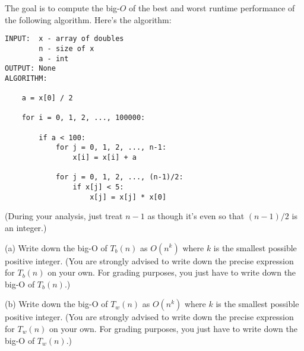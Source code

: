 The goal is to compute the big-$O$ of the best and worst
runtime performance
of the following algorithm. 
Here's the algorithm:
\begin{Verbatim}[frame=single]
INPUT:  x - array of doubles
        n - size of x
        a - int
OUTPUT: None
ALGORITHM:

    a = x[0] / 2                               

    for i = 0, 1, 2, ..., 100000:

        if a < 100:
            for j = 0, 1, 2, ..., n-1:
                x[i] = x[i] + a                

            for j = 0, 1, 2, ..., (n-1)/2:
                if x[j] < 5:                   
                    x[j] = x[j] * x[0]         

\end{Verbatim}

(During your analysis, just treat $n - 1$ as though it's even so that 
$(n - 1)/2$ is an integer.)

(a) Write down the big-O of $T_b(n)$ as $O(n^k)$
where $k$ is the smallest possible positive integer.
(You are strongly advised to write down the precise expression
for $T_b(n)$ on your own. 
For grading purposes, you just have to write down the big-O of $T_b(n)$.)

(b) Write down the big-O of $T_w(n)$ as $O(n^k)$
where $k$ is the smallest possible positive integer.
(You are strongly advised to write down the precise expression
for $T_w(n)$ on your own. 
For grading purposes, you just have to write down the big-O of $T_w(n)$.)


